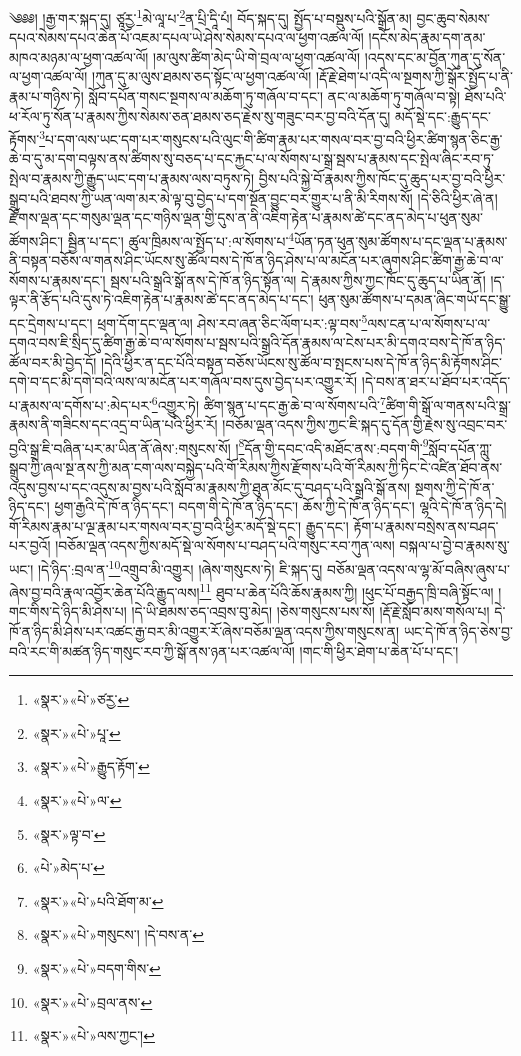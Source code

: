 ༄༅༅། །རྒྱ་གར་སྐད་དུ། ཙཱརྱ་\footnote{«སྣར་»«པེ་»ཙརྱ་}མེ་ལཱ་པ་\footnote{«སྣར་»«པེ་»པཱ་}ན་པྲི་དཱི་པཾ། བོད་སྐད་དུ། སྤྱོད་པ་བསྡུས་པའི་སྒྲོན་མ། བྱང་ཆུབ་སེམས་དཔའ་སེམས་དཔའ་ཆེན་པོ་འཇམ་དཔལ་ཡེ་ཤེས་སེམས་དཔའ་ལ་ཕྱག་འཚལ་ལོ། །དངོས་མེད་རྣམ་དག་ནམ་མཁའ་མཉམ་ལ་ཕྱག་འཚལ་ལོ། །མ་ལུས་ཚིག་མེད་ཡི་གེ་བྲལ་ལ་ཕྱག་འཚལ་ལོ། །འདས་དང་མ་བྱོན་ཀུན་དུ་སོན་ལ་ཕྱག་འཚལ་ལོ། །ཀུན་དུ་མ་ལུས་ཐམས་ཅད་སྟོང་ལ་ཕྱག་འཚལ་ལོ། །རྡོ་རྗེ་ཐེག་པ་འདི་ལ་སྔགས་ཀྱི་སྒོར་སྤྱོད་པ་ནི་རྣམ་པ་གཉིས་ཏེ། སློབ་དཔོན་གསང་སྔགས་ལ་མཆོག་ཏུ་གཞོལ་བ་དང་། ནང་ལ་མཆོག་ཏུ་གཞོལ་བ་སྟེ། ཐོས་པའི་ཕ་རོལ་ཏུ་སོན་པ་རྣམས་ཀྱིས་སེམས་ཅན་ཐམས་ཅད་རྗེས་སུ་གཟུང་བར་བྱ་བའི་དོན་དུ། མདོ་སྡེ་དང་:རྒྱུད་དང་རྟོགས་\footnote{«སྣར་»«པེ་»རྒྱུད་རྟོག་}པ་དག་ལས་ཡང་དག་པར་གསུངས་པའི་ལུང་གི་ཚིག་རྣམ་པར་གསལ་བར་བྱ་བའི་ཕྱིར་ཚིག་སྙན་ཅིང་རྒྱ་ཆེ་བ་དུ་མ་དག་བལྟས་ནས་ཚིགས་སུ་བཅད་པ་དང་རྐྱང་པ་ལ་སོགས་པ་སྒྲ་སྦས་པ་རྣམས་དང་སྤེལ་ཞིང་རབ་ཏུ་སྤེལ་བ་རྣམས་ཀྱི་རྒྱུད་ཡང་དག་པ་རྣམས་ལས་བཏུས་ཏེ། བྱིས་པའི་སྐྱེ་བོ་རྣམས་ཀྱིས་ཁོང་དུ་ཆུད་པར་བྱ་བའི་ཕྱིར་སྒྲུབ་པའི་ཐབས་ཀྱི་ཡན་ལག་མར་མེ་ལྟ་བུ་བྱེད་པ་དག་སྔོན་བྱུང་བར་གྱུར་པ་ནི་མི་རིགས་སོ། །དེ་ཅིའི་ཕྱིར་ཞེ་ན། རྫོགས་ལྡན་དང་གསུམ་ལྡན་དང་གཉིས་ལྡན་གྱི་དུས་ན་ནི་འཇིག་རྟེན་པ་རྣམས་ཚེ་དང་ནད་མེད་པ་ཕུན་སུམ་ཚོགས་ཤིང་། སྦྱིན་པ་དང་། ཚུལ་ཁྲིམས་ལ་སྤྱོད་པ་:ལ་སོགས་པ་\footnote{«སྣར་»«པེ་»ལ་}ཡོན་ཏན་ཕུན་སུམ་ཚོགས་པ་དང་ལྡན་པ་རྣམས་ནི་བསྟན་བཅོས་ལ་གནས་ཤིང་ཡོངས་སུ་ཚོལ་བས་དེ་ཁོ་ན་ཉིད་ཤེས་པ་ལ་མངོན་པར་ཞུགས་ཤིང་ཚིག་རྒྱ་ཆེ་བ་ལ་སོགས་པ་རྣམས་དང་། སྦས་པའི་སྒྲའི་སྒོ་ནས་དེ་ཁོ་ན་ཉིད་སྟོན་ལ། དེ་རྣམས་ཀྱིས་ཀྱང་ཁོང་དུ་ཆུད་པ་ཡིན་ནོ། །ད་ལྟར་ནི་རྩོད་པའི་དུས་ཏེ་འཇིག་རྟེན་པ་རྣམས་ཚེ་དང་ནད་མེད་པ་དང་། ཕུན་སུམ་ཚོགས་པ་དམན་ཞིང་གཡོ་དང་སྒྱུ་དང་དྲེགས་པ་དང་། ཕྲག་དོག་དང་ལྡན་ལ། ཤེས་རབ་ཞན་ཅིང་ལོག་པར་:ལྟ་བས་\footnote{«སྣར་»ལྟ་བ་}ལས་ངན་པ་ལ་སོགས་པ་ལ་དགའ་བས་ཇི་སྲིད་དུ་ཚིག་རྒྱ་ཆེ་བ་ལ་སོགས་པ་སྦས་པའི་སྒྲའི་དོན་རྣམས་ལ་ངེས་པར་མི་དགའ་བས་དེ་ཁོ་ན་ཉིད་ཚོལ་བར་མི་བྱེད་དོ། །དེའི་ཕྱིར་ན་དང་པོའི་བསྟན་བཅོས་ཡོངས་སུ་ཚོལ་བ་སྤངས་པས་དེ་ཁོ་ན་ཉིད་མི་རྟོགས་ཤིང་དགེ་བ་དང་མི་དགེ་བའི་ལས་ལ་མངོན་པར་གཞོལ་བས་དུས་བྱེད་པར་འགྱུར་རོ། །དེ་བས་ན་ཐར་པ་ཐོབ་པར་འདོད་པ་རྣམས་ལ་དགོས་པ་:མེད་པར་\footnote{«པེ་»མེད་པ་}འགྱུར་ཏེ། ཚིག་སྙན་པ་དང་རྒྱ་ཆེ་བ་ལ་སོགས་པའི་\footnote{«སྣར་»«པེ་»པའི་ཐོག་མ་}ཚིག་གི་སྒོ་ལ་གནས་པའི་སྒྲ་རྣམས་ནི་གཟིངས་དང་འདྲ་བ་ཡིན་པའི་ཕྱིར་རོ། །བཅོམ་ལྡན་འདས་ཀྱིས་ཀྱང་ཇི་སྐད་དུ་དོན་གྱི་རྗེས་སུ་འབྲང་བར་བྱའི་སྒྲ་ཇི་བཞིན་པར་མ་ཡིན་ནོ་ཞེས་:གསུངས་སོ། །\footnote{«སྣར་»«པེ་»གསུངས་། །དེ་བས་ན་}དོན་གྱི་དབང་འདི་མཐོང་ནས་:བདག་གི་\footnote{«སྣར་»«པེ་»བདག་གིས་}སློབ་དཔོན་ཀླུ་སྒྲུབ་ཀྱི་ཞལ་སྔ་ནས་ཀྱི་མན་ངག་ལས་བསྐྱེད་པའི་གོ་རིམས་ཀྱིས་རྫོགས་པའི་གོ་རིམས་ཀྱི་ཏིང་ངེ་འཛིན་ཐོབ་ནས་འདུས་བྱས་པ་དང་འདུས་མ་བྱས་པའི་སློབ་མ་རྣམས་ཀྱི་ཐུན་མོང་དུ་བཤད་པའི་སྒྲའི་སྒོ་ནས། སྔགས་ཀྱི་དེ་ཁོ་ན་ཉིད་དང་། ཕྱག་རྒྱའི་དེ་ཁོ་ན་ཉིད་དང་། བདག་གི་དེ་ཁོ་ན་ཉིད་དང་། ཆོས་ཀྱི་དེ་ཁོ་ན་ཉིད་དང་། ལྷའི་དེ་ཁོ་ན་ཉིད་དེ། གོ་རིམས་རྣམ་པ་ལྔ་རྣམ་པར་གསལ་བར་བྱ་བའི་ཕྱིར་མདོ་སྡེ་དང་། རྒྱུད་དང་། རྟོག་པ་རྣམས་བསྲེས་ནས་བཤད་པར་བྱའོ། །བཅོམ་ལྡན་འདས་ཀྱིས་མདོ་སྡེ་ལ་སོགས་པ་བཤད་པའི་གསུང་རབ་ཀུན་ལས། བསྐལ་པ་བྱེ་བ་རྣམས་སུ་ཡང་། །དེ་ཉིད་:བྲལ་ན་\footnote{«སྣར་»«པེ་»བྲལ་ནས་}འགྲུབ་མི་འགྱུར། །ཞེས་གསུངས་ཏེ། ཇི་སྐད་དུ། བཅོམ་ལྡན་འདས་ལ་ལྷ་མོ་བཞིས་ཞུས་པ་ཞེས་བྱ་བའི་རྣལ་འབྱོར་ཆེན་པོའི་རྒྱུད་ལས།\footnote{«སྣར་»«པེ་»ལས་ཀྱང་།} ཐུབ་པ་ཆེན་པོའི་ཆོས་རྣམས་ཀྱི། །ཕུང་པོ་བརྒྱད་ཁྲི་བཞི་སྟོང་ལ། །གང་གིས་དེ་ཉིད་མི་ཤེས་པ། །དེ་ཡི་ཐམས་ཅད་འབྲས་བུ་མེད། །ཅེས་གསུངས་པས་སོ། །རྡོ་རྗེ་སློབ་མས་གསོལ་པ། དེ་ཁོ་ན་ཉིད་མི་ཤེས་པར་འཚང་རྒྱ་བར་མི་འགྱུར་རོ་ཞེས་བཅོམ་ལྡན་འདས་ཀྱིས་གསུངས་ན། ཡང་དེ་ཁོ་ན་ཉིད་ཅེས་བྱ་བའི་རང་གི་མཚན་ཉིད་གསུང་རབ་ཀྱི་སྒོ་ནས་ཉན་པར་འཚལ་ལོ། །གང་གི་ཕྱིར་ཐེག་པ་ཆེན་པོ་པ་དང་། 